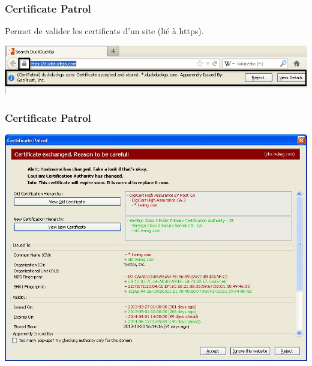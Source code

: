 \documentclass{beamer}
\begin{document}
\begin{frame}
\frametitle{Certificate Patrol}
Permet de valider les certificats d'un site (lié à https).
\begin{center}
\includegraphics[scale=0.5] {./images/CertificatePatrol.png}
\end{center}
\end{frame}

\begin{frame}
\frametitle{Certificate Patrol}
\begin{center}
\includegraphics[scale=0.5] {./images/Certificate_Patrol_certifcat_a_change.jpg}
\end{center}
\end{frame}
\end{document}
